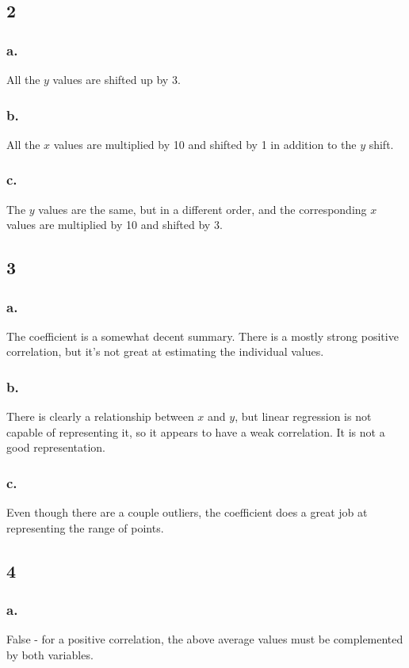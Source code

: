 \documentclass[11pt]{article}
\begin{document}
\subsection{2}
\subsubsection{a.}
All the $y$ values are shifted up by 3. 

\subsubsection{b.}
All the $x$ values are multiplied by 10 and shifted by 1 in addition to the $y$
shift. 

\subsubsection{c.}
The $y$ values are the same, but in a different order, and the corresponding $x$
values are multiplied by 10 and shifted by 3. 

\subsection{3}
\subsubsection{a.}
The coefficient is a somewhat decent summary. There is a mostly strong positive
correlation, but it's not great at estimating the individual values. 
\subsubsection{b.}
There is clearly a relationship between $x$ and $y$, but linear regression is
not capable of representing it, so it appears to have a weak correlation. It is
not a good representation. 

\subsubsection{c.}
Even though there are a couple outliers, the coefficient does a great job at
representing the range of points. 

\subsection{4}
\subsubsection{a.}
False - for a positive correlation, the above average values must be
complemented by both variables. 
\end{document}
